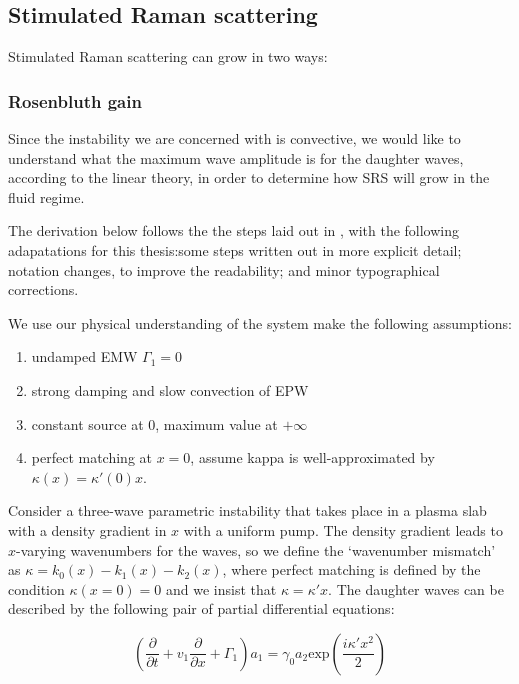 \subsection{Stimulated Raman scattering}

Stimulated Raman scattering can grow in two ways: 

\subsubsection{Rosenbluth gain}

Since the instability we are concerned with is convective, we would like to understand what the maximum wave amplitude is for the daughter waves, according to the linear theory, in order to determine how SRS will grow in the fluid regime.

The derivation below follows the the steps laid out in \citet{Nishikawa1976}, with the following adapatations for this thesis:some steps written out in more explicit detail; notation changes, to improve the readability; and minor typographical corrections. 

We use our physical understanding of the system make the following assumptions:
\begin{enumerate}
	\item undamped EMW $\Gamma_1 = 0$
	\item strong damping and slow convection of EPW
	\item constant source at 0, maximum value at $+\infty$
	\item perfect matching at $x=0$, assume kappa is well-approximated by 
	$\kappa(x) = \kappa'(0)x$.
\end{enumerate}

Consider a three-wave parametric instability that takes place in a plasma slab with a density gradient in $x$ with a uniform pump. The density gradient leads to $x$-varying wavenumbers for the waves, so we define the `wavenumber mismatch' as $\kappa = k_0(x) - k_1(x) - k_2(x)$, where perfect matching is defined by the condition $\kappa(x=0) = 0$ and we insist that $\kappa = \kappa' x$. The daughter waves can be described by the following pair of partial differential equations:

\begin{equation}
 \left(\frac{\partial}{\partial t} + v_1\frac{\partial}{\partial x} + \Gamma_1 \right)a_1 = \gamma_0a_2\text{exp}\left(\frac{i\kappa'x^2}{2}\right)
\end{equation}

